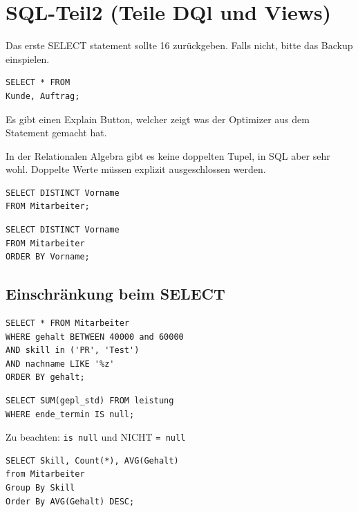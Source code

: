 \documentclass[a4paper]{article}
\title{\docTitle}
\author{Moritz}
\date{\today}
\begin{document}
\maketitle
\tableofcontents


\section{SQL-Teil2 (Teile DQl und Views)}

Das erste SELECT statement sollte 16 zurückgeben. Falls nicht, bitte das Backup einspielen.

\begin{lstlisting}
SELECT * FROM 
Kunde, Auftrag;
\end{lstlisting}

Es gibt einen Explain Button, welcher zeigt was der Optimizer aus dem Statement gemacht hat.

In der Relationalen Algebra gibt es keine doppelten Tupel, in SQL aber sehr wohl. Doppelte Werte müssen explizit ausgeschlossen werden.

\begin{lstlisting}
SELECT DISTINCT Vorname
FROM Mitarbeiter;
\end{lstlisting}

\begin{lstlisting}
SELECT DISTINCT Vorname
FROM Mitarbeiter
ORDER BY Vorname;
\end{lstlisting}


\subsection{Einschränkung beim SELECT}

\begin{lstlisting}
SELECT * FROM Mitarbeiter
WHERE gehalt BETWEEN 40000 and 60000
AND skill in ('PR', 'Test')
AND nachname LIKE '%z'
ORDER BY gehalt;
\end{lstlisting}

\begin{lstlisting}
SELECT SUM(gepl_std) FROM leistung
WHERE ende_termin IS null;
\end{lstlisting}

Zu beachten: \lstinline|is null| und NICHT \lstinline|= null|

\begin{lstlisting}
SELECT Skill, Count(*), AVG(Gehalt)
from Mitarbeiter
Group By Skill
Order By AVG(Gehalt) DESC;
\end{lstlisting}
\end{document}
